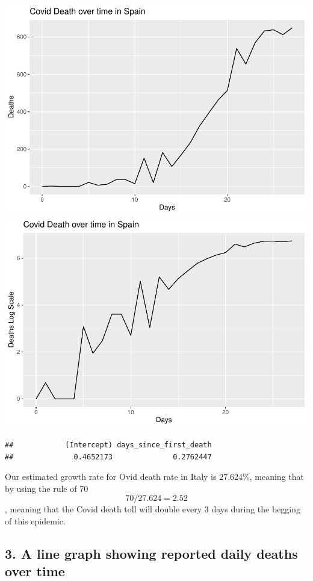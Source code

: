 \documentclass[
]{article}
\begin{document}
\includegraphics{HW3_files/figure-latex/unnamed-chunk-7-1.pdf}
\includegraphics{HW3_files/figure-latex/unnamed-chunk-7-2.pdf}

\begin{verbatim}
##            (Intercept) days_since_first_death 
##              0.4652173              0.2762447
\end{verbatim}

Our estimated growth rate for Ovid death rate in Italy is 27.624\%,
meaning that by using the rule of 70 \[ 70/27.624 = 2.52\], meaning that
the Covid death toll will double every 3 days during the begging of this
epidemic.

\hypertarget{a-line-graph-showing-reported-daily-deaths-over-time}{%
\subsection{3. A line graph showing reported daily deaths over
time}\label{a-line-graph-showing-reported-daily-deaths-over-time}}
\end{document}
